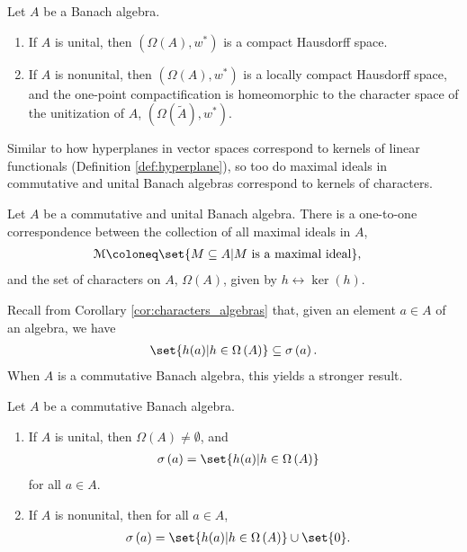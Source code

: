 % 
\begin{proposition}
  Let $A$ be a Banach algebra.
  \begin{enumerate}[(1)]
    \item If $A$ is unital, then $\left( \Omega\left( A \right),w^{\ast} \right)$ is a compact Hausdorff space.
    \item If $A$ is nonunital, then $\left( \Omega\left( A \right),w^{\ast} \right)$ is a locally compact Hausdorff space, and the one-point compactification is homeomorphic to the character space of the unitization of $A$, $\left( \Omega\left( \widetilde{A} \right),w^{\ast} \right)$.
  \end{enumerate}
\end{proposition}
Similar to how hyperplanes in vector spaces correspond to kernels of linear functionals (Definition \ref{def:hyperplane}), so too do maximal ideals in commutative and unital Banach algebras correspond to kernels of characters.
\begin{theorem}
  Let $A$ be a commutative and unital Banach algebra. There is a one-to-one correspondence between the collection of all maximal ideals in $A$,
  \begin{align*}
    \mathcal{M} &\coloneq \set{M\subseteq A | M\text{ is a maximal ideal}},
  \end{align*}
  and the set of characters on $A$, $\Omega\left( A \right)$, given by $h\leftrightarrow \ker\left( h \right)$.
\end{theorem}
Recall from Corollary \ref{cor:characters_algebras} that, given an element $a\in A$ of an algebra, we have
\begin{align*}
  \set{h(a) | h\in \Omega\left( A \right)}\subseteq \sigma\left( a \right).
\end{align*}
When $A$ is a commutative Banach algebra, this yields a stronger result. 
\begin{theorem}\label{thm:spectrum_characters}
  Let $A$ be a commutative Banach algebra.
  \begin{enumerate}[(1)]
    \item If $A$ is unital, then $\Omega\left( A \right)\neq \emptyset$, and
      \begin{align*}
        \sigma\left( a \right) &= \set{h(a) | h\in \Omega\left( A \right)}
      \end{align*}
      for all $a\in A$.
    \item If $A$ is nonunital, then for all $a\in A$,
      \begin{align*}
        \sigma\left( a \right) &= \set{h(a) | h\in \Omega\left( A \right)} \cup \set{0}.
      \end{align*}
  \end{enumerate}
\end{theorem}
